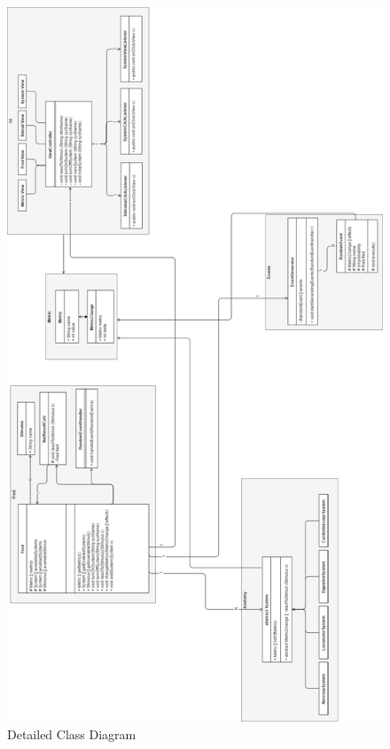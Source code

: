 \documentclass[]{article}
\begin{document}
\begin{figure}[H]
	\includegraphics[width=1.0\linewidth]{../Resources/ClassDiagram.png}
	\caption{Detailed Class Diagram}
\end{figure}

\newpage

\appendix
\end{document}
